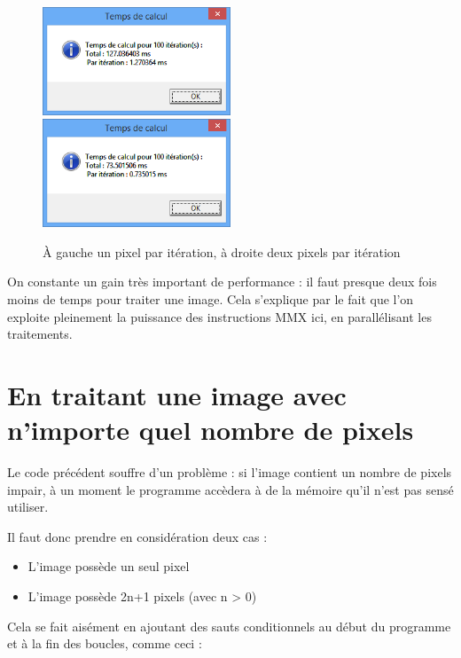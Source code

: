 \begin{figure}[!h]
   \includegraphics[width=0.5\textwidth]{screens/mmx_1px.png}
   \includegraphics[width=0.5\textwidth]{screens/mmx_2px.png}
   \caption{À gauche un pixel par itération, à droite deux pixels par itération}
\end{figure}

On constante un gain très important de performance : il faut presque deux fois moins de temps pour traiter une image. Cela s'explique par le fait que l'on exploite pleinement la puissance des instructions MMX ici, en parallélisant les traitements.

\section{En traitant une image avec n'importe quel nombre de pixels}

Le code précédent souffre d'un problème : si l'image contient un nombre de pixels impair, à un moment le programme accèdera à de la mémoire qu'il n'est pas sensé utiliser.

\medskip

\noindent Il faut donc prendre en considération deux cas :
\begin{itemize}
  \item L'image possède un seul pixel
  \item L'image possède 2n+1 pixels (avec n > 0)
\end{itemize}

\medskip

Cela se fait aisément en ajoutant des sauts conditionnels au début du programme et à la fin des boucles, comme ceci :

